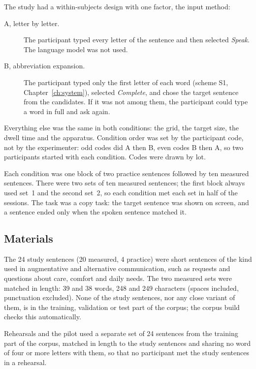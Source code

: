 The study had a within-subjects design with one factor, the input method:

\begin{description}
  \item[A, letter by letter.] The participant typed every letter of the sentence and then selected
        \emph{Speak}. The language model was not used.
  \item[B, abbreviation expansion.] The participant typed only the first letter of each word
        (scheme S1, Chapter~\ref{ch:system}), selected \emph{Complete}, and chose the target sentence from
        the candidates. If it was not among them, the participant could type a word in full and ask
        again.
\end{description}

Everything else was the same in both conditions: the grid, the target size, the dwell time and the
apparatus. Condition order was set by the participant code, not by the experimenter: odd codes did A
then B, even codes B then A, so two participants started with each condition. Codes were drawn by lot.

Each condition was one block of two practice sentences followed by ten measured sentences. There were
two sets of ten measured sentences; the first block always used set~1 and the second set~2, so each
condition met each set in half of the sessions. The task was a copy task: the target sentence was shown
on screen, and a sentence ended only when the spoken sentence matched it.

\subsection{Materials}
\label{sec:b-materials}

The 24 study sentences (20 measured, 4 practice) were short sentences of the kind used in augmentative
and alternative communication, such as requests and questions about care, comfort and daily needs. The
two measured sets were matched in length: 39 and 38 words, 248 and 249 characters (spaces included,
punctuation excluded). None of the study sentences, nor any close variant of them, is in the training,
validation or test part of the corpus; the corpus build checks this automatically.

Rehearsals and the pilot used a separate set of 24 sentences from the training part of the corpus,
matched in length to the study sentences and sharing no word of four or more letters with them, so that
no participant met the study sentences in a rehearsal.

